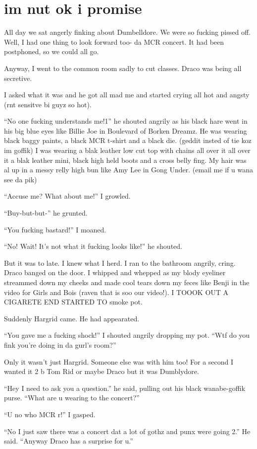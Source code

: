 \section{im nut ok i promise}


\XXX{\Xfill 666\Xfill}

All day we sat angerly finking about Dumbelldore. We were so fucking pissed off. Well, I had one thing to look forward too- da MCR concert. It had been postphoned, so we could all go.

\begin{sloppypar}
    Anyway, I went to the common room sadly to cut classes. Draco was being all secretive.
\end{sloppypar}

I asked what it was and he got all mad me and started crying all hot and angsty (rnt sensitve bi guyz so hot).

\enquote{No one fucking understands me!1} he shouted angrily as his black hare went in his big blue eyes like Billie Joe in Boulevard of Borken Dreamz. He was wearing black baggy paints, a black MCR t-shirt and a black die. (geddit insted of tie koz im goffik) I was wearing a blak leather low cut top with chains all over it all over it a blak leather mini, black high held boots and a cross belly fing. My hair was al up in a messy relly high bun like Amy Lee in Gong Under. (email me if u wana see da pik)

\enquote{Accuse me? What about me!} I growled.

\enquote{Buy-but-but-} he grunted.

\enquote{You fucking bastard!} I moaned.

\enquote{No! Wait! It's not what it fucking looks like!} he shouted.

But it was to late. I knew what I herd. I ran to the bathroom angrily, cring. Draco banged on the door. I whipped and whepped as my blody eyeliner streammed down my cheeks and made cool tears down my feces like Benji in the video for Girls and Bois (raven that is soo our video!). I TOOOK OUT A CIGARETE END STARTED TO smoke pot.

Suddenly Hargrid came. He had appearated.

\enquote{You gave me a fucking shock!} I shouted angrily dropping my pot. \enquote{Wtf do you fink you're doing in da gurl's room?}

Only it wasn't just Hargrid. Someone else was with him too! For a second I wanted it 2 b Tom Rid or maybe Draco but it was Dumblydore.

\enquote{Hey I need to ask you a question.} he said, pulling out his black wanabe-goffik purse. \enquote{What are u wearing to the concert?}

\enquote{U no who MCR r!} I gasped.

\enquote{No I just saw there was a concert dat a lot of gothz and punx were going 2.} He said. \enquote{Anyway Draco has a surprise for u.}

